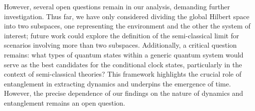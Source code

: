However, several open questions remain in our analysis, demanding further investigation.  Thus far, we have only considered dividing the global Hilbert space into two subspaces, one representing the environment and the other the system of interest; future work could explore the definition of the semi-classical limit for scenarios involving more than two subspaces.  Additionally, a critical question remains: what types of quantum states within a generic quantum system would serve as the best candidates for the conditional clock states, particularly in the context of semi-classical theories? This framework highlights the crucial role of entanglement in extracting dynamics and underpins the emergence of time. However, the precise dependence of our findings on the nature of dynamics and entanglement remains an open question.